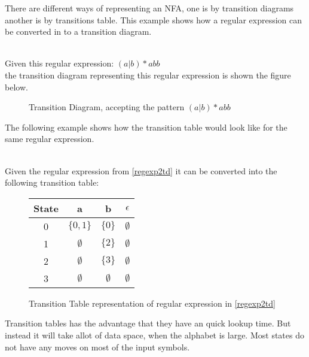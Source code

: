 There are different ways of representing an NFA, one is by transition diagrams 
another is by transitions table. This example shows how a regular expression 
can be converted in to a transition diagram.
\newpage
\begin{example} \label{regexp2td}
\cite{Aho2006}\\
Given this regular expression: $(a | b)* abb$ \\
the transition diagram representing this regular expression is shown the figure 
below.
\begin{figure}[h!]
  \centering
  \label{fig:transition diagram}
  \caption{Transition Diagram, accepting the pattern  $(a | b)* abb$}
  \end{figure}
\end{example}
The following example shows how the transition table would look like for the 
same regular expression.

\begin{example} \label{regexp2tt}
\cite{Aho2006}\\
Given the regular expression from \cref{regexp2td} it can be converted into the 
following transition table: \\
  \begin{figure}[h!]
  \centering
  \begin{tabular}{| c | c c c |}
    \hline
    \hline
    State & a & b & $\epsilon$\\
    \hline
    0 & $\{0, 1\}$ & $\{0\}$ & $\emptyset$ \\
    1 & $\emptyset$ & $\{2\}$ & $\emptyset$ \\
    2 & $\emptyset$ & $\{3\}$ & $\emptyset$ \\
    3 & $\emptyset$ & $\emptyset$ & $\emptyset$ \\
    \hline
  \end{tabular}
  \label{fig:transition table}
  \caption{Transition Table representation of regular expression in 
\cref{regexp2td}}
  \end{figure}
\end{example}
Transition tables has the advantage that they have an quick lookup time. But 
instead it will take allot of data space, when the alphabet is large. Most 
states do not have any moves on most of the input symbols. \cite{Aho2006}
